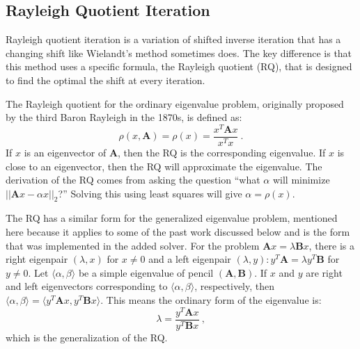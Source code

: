 \documentclass[12pt]{article}
\newcommand{\ve}[1]{\ensuremath{\mathbf{#1}}}
\begin{document}
\subsection*{Rayleigh Quotient Iteration}
Rayleigh quotient iteration is a variation of shifted inverse iteration that has a changing shift like Wielandt's method sometimes does. The key difference is that this method uses a specific formula, the Rayleigh quotient (RQ), that is designed to find the optimal the shift at every iteration. 

The Rayleigh quotient for the ordinary eigenvalue problem, originally proposed by the third Baron Rayleigh in the 1870s, is defined as:%
%
\begin{equation}
  \rho(x, \ve{A}) = \rho(x) = \frac{x^{T}\ve{A}x}{x^{T}x} \:.
  \label{RQ}
\end{equation}
%
If $x$ is an eigenvector of $\ve{A}$, then the RQ is the corresponding eigenvalue. If $x$ is close to an eigenvector, then the RQ will approximate the eigenvalue. %
The derivation of the RQ comes from asking the question ``what $\alpha$ will minimize $||\ve{A}x - \alpha x||_2$?'' Solving this using least squares will give $\alpha = \rho(x)$.%

The RQ has a similar form for the generalized eigenvalue problem, mentioned here because it applies to some of the past work discussed below and is the form that was implemented in the added solver. For the problem $\ve{A}x = \lambda \ve{B}x$, there is a right eigenpair $(\lambda, x)$ for $x \ne 0$ and a left eigenpair $(\lambda, y): y^{T}\ve{A} = \lambda y^{T}\ve{B}$ for $y \ne 0$. Let $\langle \alpha, \beta \rangle$ be a simple eigenvalue of pencil $(\ve{A}, \ve{B})$. If $x$ and $y$ are right and left eigenvectors corresponding to $\langle \alpha, \beta \rangle$, respectively, then $\langle \alpha, \beta \rangle = \langle y^{T} \ve{A} x, y^{T} \ve{B} x \rangle$. This means the ordinary form of the eigenvalue is:
\begin{equation}
 \lambda = \frac{y^{T} \ve{A} x}{y^{T} \ve{B} x} \:,
\end{equation}
which is the generalization of the RQ.%
\end{document}
